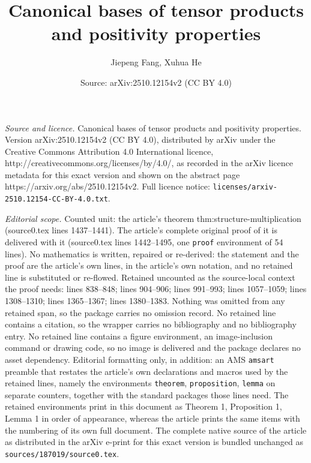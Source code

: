 \documentclass[10pt,a4paper]{amsart}
\title{Canonical bases of tensor products and positivity properties}
\author{Jiepeng Fang, Xuhua He}
\date{Source: arXiv:2510.12154v2 (CC BY 4.0)}
\begin{document}
\maketitle

\noindent\emph{Source and licence.} Canonical bases of tensor products and positivity properties. Version arXiv:2510.12154v2 (CC BY 4.0), distributed by arXiv under the Creative Commons Attribution 4.0 International licence, http://creativecommons.org/licenses/by/4.0/, as recorded in the arXiv licence metadata for this exact version and shown on the abstract page https://arxiv.org/abs/2510.12154v2. Full licence notice: \texttt{licenses/arxiv-2510.12154-CC-BY-4.0.txt}.\par\smallskip

\noindent\textit{Editorial scope.} Counted unit: the article's theorem thm:structure-multiplication (source0.tex lines 1437--1441). The article's complete original proof of it is delivered with it (source0.tex lines 1442--1495, one \texttt{proof} environment of 54 lines). No mathematics is written, repaired or re-derived: the statement and the proof are the article's own lines, in the article's own notation, and no retained line is substituted or re-flowed.  Retained uncounted as the source-local context the proof needs: lines 838--848; lines 904--906; lines 991--993; lines 1057--1059; lines 1308--1310; lines 1365--1367; lines 1380--1383.  Nothing was omitted from any retained span, so the package carries no omission record.  No retained line contains a citation, so the wrapper carries no bibliography and no bibliography entry.  No retained line contains a figure environment, an image-inclusion command or drawing code, so no image is delivered and the package declares no asset dependency.  Editorial formatting only, in addition: an AMS \texttt{amsart} preamble that restates the article's own declarations and macros used by the retained lines, namely the environments \texttt{theorem}, \texttt{proposition}, \texttt{lemma} on separate counters, together with the standard packages those lines need.  The retained environments print in this document as Theorem 1, Proposition 1, Lemma 1 in order of appearance, whereas the article prints the same items with the numbering of its own full document.  The complete native source of the article as distributed in the arXiv e-print for this exact version is bundled unchanged as \texttt{sources/187019/source0.tex}.
\end{document}
